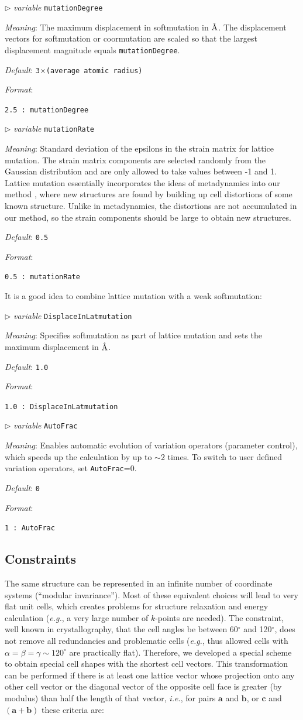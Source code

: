 \documentclass[12pt]{article}
\newcommand{\keyword}[1]{\texttt{#1}}
\newcommand{\paramacro}[6]{
\vspace{0.5cm}
$\triangleright$ \emph{variable} {\color{blue} \texttt{#1}}

\emph{Meaning}: {#2}

{#3}

\emph{Default}: \texttt{#4}

\emph{Format}:

{\addtolength{\leftskip}{10mm} 
\texttt{#5}
\par}


{\small #6}

}
\begin{document}
\paramacro{mutationDegree}{The maximum displacement in softmutation in
$\text{\r{A}}$. The displacement vectors for softmutation or coormutation are
scaled so that the largest displacement magnitude equals
\keyword{mutationDegree}.}{}{3$\times${\rm (average atomic radius)}}{2.5   :
mutationDegree}{}


\paramacro{mutationRate}{Standard deviation of the epsilons in the strain matrix
for lattice mutation. The strain matrix components are selected randomly from
the Gaussian distribution and are only allowed to take values between -1 and 1.
Lattice mutation essentially incorporates the ideas of metadynamics into our
method \cite{Oganov-book2010a, Martonak2005}, where new structures are found by
building up cell distortions of some known structure. Unlike in metadynamics,
the distortions are not accumulated in our method, so the strain components
should be large to obtain new structures.}{}{0.5}{0.5   : mutationRate}{}

\vspace{0.5cm}

It is a good idea to combine lattice mutation with a weak softmutation:


\paramacro{DisplaceInLatmutation}{Specifies softmutation as part of lattice
mutation and sets the maximum displacement in $\text{\r{A}}$.}{}{1.0}{1.0   :
DisplaceInLatmutation}{}

\paramacro{AutoFrac}{Enables automatic evolution of variation operators
(parameter control), which speeds up the calculation by up to $\sim$2 times. To
switch to user defined variation operators, set \keyword{AutoFrac}=0.}{}{0}{1 :
AutoFrac}{}


\subsection{Constraints}

The same structure can be represented in an infinite number of coordinate
systems (``modular invariance''). Most of these equivalent choices will lead to
very flat unit cells, which creates problems for structure relaxation and energy
calculation (\emph{e.g.}, a very large number of $k$-points are needed). The
constraint, well known in crystallography, that the cell angles be between
60$^\circ$ and 120$^\circ$, does not remove all redundancies and problematic
cells (\emph{e.g.}, thus allowed cells with $\alpha=\beta=\gamma \sim 120^\circ$
are practically flat). Therefore, we developed \cite{Oganov2008,
Oganov-book2010b} a special scheme to obtain special cell shapes with the
shortest cell vectors. This transformation can be performed if there is at least
one lattice vector whose projection onto any other cell vector or the diagonal
vector of the opposite cell face is greater (by modulus) than half the length of
that vector, \emph{i.e.}, for pairs $\textbf{a}$ and $\textbf{b}$, or
$\textbf{c}$ and $(\textbf{a}+\textbf{b})$ these criteria are:
\end{document}
